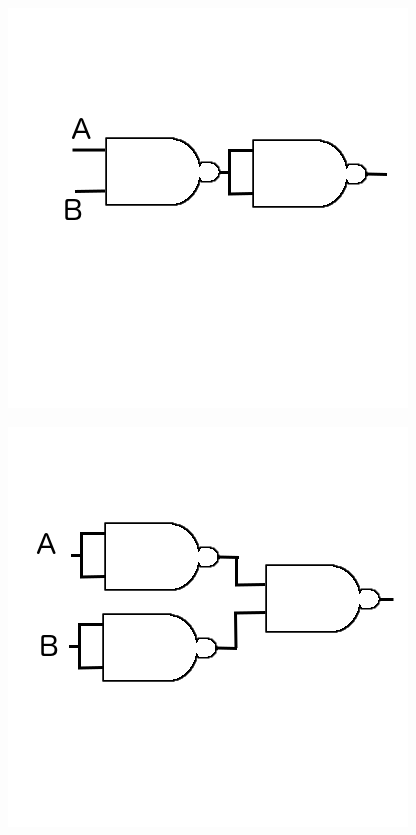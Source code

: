 \documentclass{article}
\begin{document}
	\begin{minipage}{.5\linewidth}
		\includegraphics[width=\linewidth]{figure/AND1}
		\label{fig:AND}
	\end{minipage}
	\begin{minipage}{.5\linewidth}
		\centering
		\includegraphics[width=\linewidth]{figure/OR1}
		\label{fig:OR}
	\end{minipage}\newline
\end{document}

